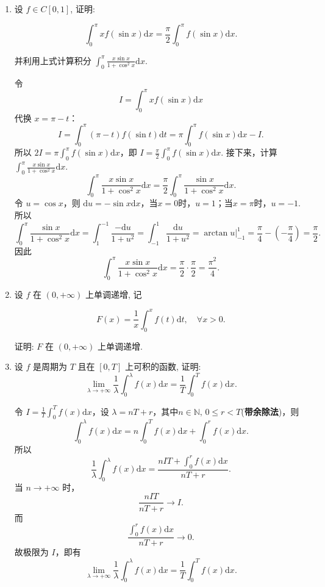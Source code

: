 \begin{enumerate}
    \item[2.]设 \(\displaystyle f\in C[0,1]\), 证明:

    \[\displaystyle \int_{0}^{\pi}x f(\sin x)\mathrm{d}x = \frac{\pi}{2}\int_{0}^{\pi}f(\sin x)\mathrm{d}x.\]

    并利用上式计算积分 \(\displaystyle \int_{0}^{\pi}{\frac{x\sin x}{1 + \cos^{2}x}}\mathrm{d}x.\)
    \begin{solution}
        令
        \[
        I = \int_0^\pi x f(\sin x) \mathrm{d}x
        \]
        代换 $\displaystyle x = \pi - t$：
        \[
        I = \int_0^\pi (\pi - t) f(\sin t) \mathrm{d}t = \pi \int_0^\pi f(\sin x) \mathrm{d}x - I.
        \]
        所以 $\displaystyle 2I = \pi \int_0^\pi f(\sin x) \mathrm{d}x$，即 $\displaystyle I = \frac{\pi}{2} \int_0^\pi f(\sin x) \mathrm{d}x$. 
        接下来，计算 $\displaystyle \int_0^\pi \frac{x \sin x}{1 + \cos^2 x} \mathrm{d}x$.\\
        \[
        \int_0^\pi \frac{x \sin x}{1 + \cos^2 x} \mathrm{d}x = \frac{\pi}{2} \int_0^\pi \frac{\sin x}{1 + \cos^2 x} \mathrm{d}x.
        \]
        令 $u = \cos x$，则 $\displaystyle \mathrm{d}u = -\sin x \mathrm{d}x$，当$x=0$时，$u=1$；当$x=\pi$时，$u=-1$.\\
        所以
        \[
        \int_0^\pi \frac{\sin x}{1 + \cos^2 x} \mathrm{d}x = \int_{1}^{-1} \frac{-\mathrm{d}u}{1+u^2} = \int_{-1}^{1} \frac{\mathrm{d}u}{1+u^2} = \arctan u \Big|_{-1}^{1} = \frac{\pi}{4} - (-\frac{\pi}{4}) = \frac{\pi}{2}.
        \]
        因此
        \[
        \int_0^\pi \frac{x \sin x}{1 + \cos^2 x} \mathrm{d}x = \frac{\pi}{2} \cdot \frac{\pi}{2} = \frac{\pi^2}{4}.
        \]
    \end{solution}
    \item[3.]设 \(f\) 在 \((0, + \infty)\) 上单调递增, 记

    \[\displaystyle F(x) = \frac{1}{x}\int_{0}^{x}f(t)\mathrm{d}t,\quad \forall x > 0.\]

    证明: \(F\) 在 \((0, + \infty)\) 上单调递增.

    \item[4.]设 \(f\) 是周期为 \(T\) 且在 \([0,T]\) 上可积的函数, 证明:
    \[\displaystyle\lim_{\lambda \to +\infty}\frac{1}{\lambda}\int_{0}^{\lambda}f(x)\mathrm{d}x = \frac{1}{T}\int_{0}^{T}f(x)\mathrm{d}x.\]
    \begin{solution}
        令 $\displaystyle I = \frac{1}{T} \int_0^T f(x) \mathrm{d}x$，设 $\displaystyle\lambda = nT + r$，其中$n\in\mathbb{N},\,0 \leq r < T$(\textbf{带余除法})，则
        \[
        \int_0^{\lambda} f(x) \mathrm{d}x = n \int_0^T f(x) \mathrm{d}x + \int_0^r f(x) \mathrm{d}x.
        \]
        所以
        \[
        \frac{1}{\lambda} \int_0^{\lambda} f(x) \mathrm{d}x = \frac{n I T + \int_0^r f(x) \mathrm{d}x}{nT + r}.
        \]
        当 $n \to +\infty$ 时，
        \[
        \frac{n I T}{nT + r} \to I.
        \]
        而
        \[
        \frac{\displaystyle\int_0^r f(x) \mathrm{d}x}{nT + r} \to 0.
        \]
        故极限为 $I$，即有
        \[
        \lim_{\lambda \to +\infty} \frac{1}{\lambda} \int_0^{\lambda} f(x) \mathrm{d}x = \frac{1}{T} \int_0^T f(x) \mathrm{d}x.
        \] 
    \end{solution}


\end{enumerate}
